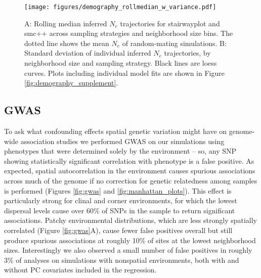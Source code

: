\documentclass[10pt,twoside,lineno,hidelinks]{preprint}
\begin{document}
\begin{figure}[p]
\centering
\texttt{[image: figures/demography\_rollmedian\_w\_variance.pdf]}
\caption{A: Rolling median inferred $N_{e}$ trajectories for stairwayplot and smc++ across sampling strategies and neighborhood size bins. The dotted line shows the mean $N_{e}$ of random-mating simulations. B: Standard deviation of individual inferred $N_{e}$ trajectories, by neighborhood size and sampling strategy. Black lines are loess curves. Plots including individual model fits are shown in Figure \ref{fig:demography_supplement}.}
\label{fig:demography}
\end{figure}

\subsection{GWAS}

To ask what confounding effects spatial genetic variation might have on genome-wide association studies we performed GWAS on our simulations using phenotypes that were determined solely by the environment
-- so, any SNP showing statistically significant correlation with phenotype is a false positive. 
As expected, spatial autocorrelation in the environment causes spurious associations 
across much of the genome if no correction for genetic relatedness among samples is performed (Figures \ref{fig:gwas} and \ref{fig:manhattan_plots}). 
This effect is particularly strong for clinal and corner environments, 
for which the lowest dispersal levels cause over 60\% of SNPs in the sample to return significant associations. 
Patchy environmental distributions, which are less strongly spatially correlated (Figure \ref{fig:gwas}A), 
cause fewer false positives overall but still produce spurious associations at roughly 10\% of sites at the lowest neighborhood sizes. 
Interestingly we also observed a small number of false positives in roughly 3\% of analyses on simulations with nonspatial environments, both with and without PC covariates included in the regression.
\end{document}
